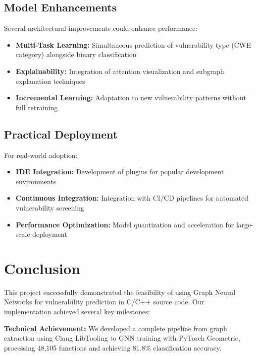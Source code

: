\subsection{Model Enhancements}

Several architectural improvements could enhance performance:
\begin{itemize}
\item \textbf{Multi-Task Learning:} Simultaneous prediction of vulnerability type (CWE category) alongside binary classification
\item \textbf{Explainability:} Integration of attention visualization and subgraph explanation techniques
\item \textbf{Incremental Learning:} Adaptation to new vulnerability patterns without full retraining
\end{itemize}

\subsection{Practical Deployment}

For real-world adoption:
\begin{itemize}
\item \textbf{IDE Integration:} Development of plugins for popular development environments
\item \textbf{Continuous Integration:} Integration with CI/CD pipelines for automated vulnerability screening
\item \textbf{Performance Optimization:} Model quantization and acceleration for large-scale deployment
\end{itemize}

\section{Conclusion}

This project successfully demonstrated the feasibility of using Graph Neural Networks for vulnerability prediction in C/C++ source code. Our implementation achieved several key milestones:

\textbf{Technical Achievement:} We developed a complete pipeline from graph extraction using Clang LibTooling to GNN training with PyTorch Geometric, processing 48,105 functions and achieving 81.8\% classification accuracy.


